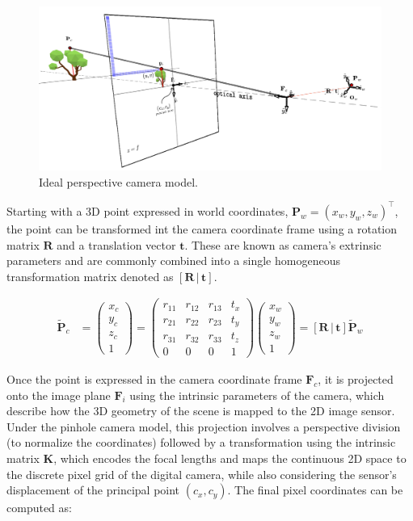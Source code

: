 \begin{figure}[!ht]
    \centering
    \includegraphics[width=0.5\linewidth]{images/methodology/pinhole_model/pinhole_model_2.png}
    \caption{Ideal perspective camera model.}
    \label{fig:pinhole_model}
\end{figure}

Starting with a 3D point expressed in world coordinates, $\mathbf{P}_w = \left(x_w, y_w, z_w\right)^\top$, the point can be transformed int the camera coordinate frame using a rotation matrix $\mathbf{R}$ and a translation vector $\mathbf{t}$. These are known as camera's extrinsic parameters and are commonly combined into a single homogeneous transformation matrix denoted as $\left[\mathbf{R} \,|\, \mathbf{t}\right]$.

\begin{align}
    \tilde{\mathbf{P}}_c 
    &=
    \begin{pmatrix}
        x_c \\
        y_c \\
        z_c \\
        1
    \end{pmatrix}
    =
    \begin{pmatrix}
        r_{11} & r_{12} & r_{13} & t_x \\
        r_{21} & r_{22} & r_{23} & t_y \\
        r_{31} & r_{32} & r_{33} & t_z \\
        0 & 0 & 0 & 1
    \end{pmatrix}
    \begin{pmatrix}
        x_w \\
        y_w \\
        z_w \\
        1
    \end{pmatrix}
    =
    \left[ \mathbf{R} \,|\, \mathbf{t} \right] \tilde{\mathbf{P}}_w 
\end{align}

Once the point is expressed in the camera coordinate frame $\mathbf{F}_c$, it is projected onto the image plane $\mathbf{F}_i$ using the intrinsic parameters of the camera, which describe how the 3D geometry of the scene is mapped to the 2D image sensor. Under the pinhole camera model, this projection involves a perspective division (to normalize the coordinates) followed by a transformation using the intrinsic matrix $\mathbf{K}$, which encodes the focal lengths and maps the continuous 2D space to the discrete pixel grid of the digital camera, while also considering the sensor's displacement of the principal point $(c_x, c_y)$. The final pixel coordinates can be computed as:

